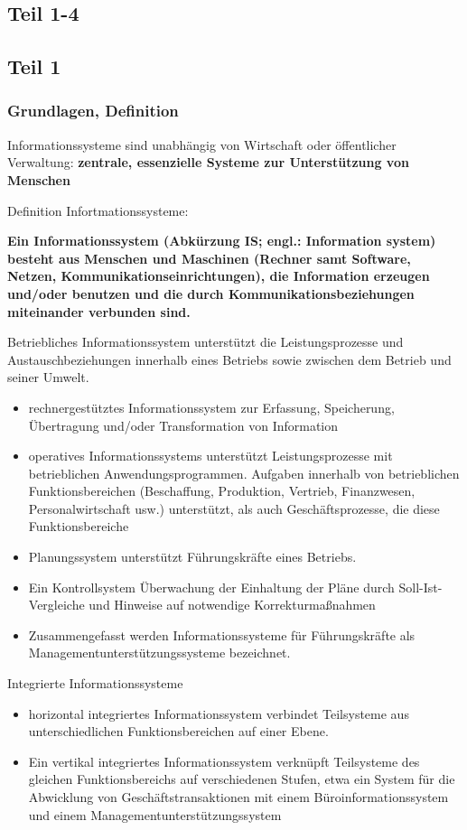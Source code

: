 \subsection{Teil 1-4}
\subsection{Teil 1}
\subsubsection{Grundlagen, Definition}
Informationssysteme sind unabhängig von Wirtschaft oder öffentlicher Verwaltung:
\textbf{zentrale, essenzielle Systeme zur Unterstützung von Menschen}
\par
Definition Infortmationssysteme:
\par
\textbf{Ein Informationssystem (Abkürzung IS; engl.: Information system) besteht aus Menschen und Maschinen (Rechner samt Software, Netzen, Kommunikationseinrichtungen), die Information erzeugen und/oder benutzen und die durch Kommunikationsbeziehungen miteinander verbunden sind.}
\par
Betriebliches Informationssystem unterstützt die Leistungsprozesse und Austauschbeziehungen innerhalb eines Betriebs sowie zwischen dem Betrieb und seiner Umwelt.
\par
\begin{itemize}
  \item rechnergestütztes Informationssystem zur Erfassung, Speicherung, Übertragung und/oder Transformation von Information
  \item operatives Informationssystems unterstützt Leistungsprozesse mit betrieblichen Anwendungsprogrammen. Aufgaben innerhalb von betrieblichen Funktionsbereichen (Beschaffung, Produktion, Vertrieb, Finanzwesen, Personalwirtschaft usw.) unterstützt, als auch Geschäftsprozesse, die diese Funktionsbereiche 
  \item Planungssystem unterstützt Führungskräfte eines Betriebs.
  \item Ein Kontrollsystem Überwachung der Einhaltung der Pläne durch Soll-Ist-Vergleiche und Hinweise auf notwendige Korrekturmaßnahmen
  \item Zusammengefasst werden Informationssysteme für Führungskräfte als Managementunterstützungssysteme bezeichnet.
\end{itemize}
\par
Integrierte Informationssysteme
\begin{itemize}
  \item horizontal integriertes Informationssystem verbindet Teilsysteme aus unterschiedlichen Funktionsbereichen auf einer Ebene.
  \item Ein vertikal integriertes Informationssystem verknüpft Teilsysteme des gleichen Funktionsbereichs auf verschiedenen Stufen, etwa ein System für die Abwicklung von Geschäftstransaktionen mit einem Büroinformationssystem und einem Managementunterstützungssystem 
\end{itemize}
